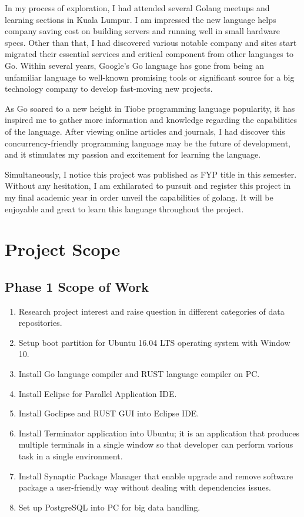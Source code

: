 In my process of exploration, I had attended several Golang meetups and learning sections in Kuala Lumpur. I am impressed the new language helps company saving cost on building servers and running well in small hardware specs. Other than that, I had discovered various notable company and sites start migrated their essential services and critical component from other languages to Go. Within several years, Google’s Go language has gone from being an unfamiliar language to well-known promising tools or significant source for a big technology company to develop fast-moving new projects.

As Go soared to a new height in Tiobe programming language popularity, it has inspired me to gather more information and knowledge regarding the capabilities of the language. After viewing online articles and journals, I had discover this concurrency-friendly programming language may be the future of development, and it stimulates my passion and excitement for learning the language.

Simultaneously, I notice this project was published as FYP title in this semester. Without any hesitation, I am exhilarated to pursuit and register this project in my final academic year in order unveil the capabilities of golang. It will be enjoyable and great to learn this language throughout the project.



\section{Project Scope}

\subsection{Phase 1 Scope of Work}

\begin{enumerate}[topsep=0pt,itemsep=-1ex,partopsep=1ex,parsep=1.5ex]
	
\item Research project interest and raise question in different categories of data repositories.  
\item Setup boot partition for Ubuntu 16.04 LTS operating system with Window 10.
\item Install Go language compiler and RUST language compiler on PC. 
\item Install Eclipse for Parallel Application IDE.
\item Install Goclipse and RUST GUI into Eclipse IDE. 
\item Install Terminator application into Ubuntu; it is an application that produces multiple terminals in a single window so that developer can perform various task in a single environment.
\item Install Synaptic Package Manager that enable upgrade and remove software package a user-friendly way without dealing with dependencies issues.
\item Set up PostgreSQL into PC for big data handling.

\end{enumerate}

